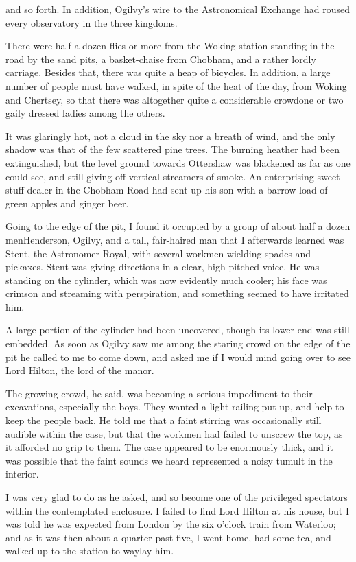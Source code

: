 and so forth. In addition, Ogilvy's wire to the Astronomical
Exchange had roused every observatory in the three kingdoms.

There were half a dozen flies or more from the Woking station
standing in the road by the sand pits, a basket-chaise from
Chobham, and a rather lordly carriage. Besides that, there was
quite a heap of bicycles. In addition, a large number of people
must have walked, in spite of the heat of the day, from Woking and
Chertsey, so that there was altogether quite a considerable
crowd\dash{}one or two gaily dressed ladies among the others.

It was glaringly hot, not a cloud in the sky nor a breath of wind,
and the only shadow was that of the few scattered pine trees. The
burning heather had been extinguished, but the level ground towards
Ottershaw was blackened as far as one could see, and still giving
off vertical streamers of smoke. An enterprising sweet-stuff dealer
in the Chobham Road had sent up his son with a barrow-load of green
apples and ginger beer.

Going to the edge of the pit, I found it occupied by a group of
about half a dozen men\dash{}Henderson, Ogilvy, and a tall, fair-haired
man that I afterwards learned was Stent, the Astronomer Royal, with
several workmen wielding spades and pickaxes. Stent was giving
directions in a clear, high-pitched voice. He was standing on the
cylinder, which was now evidently much cooler; his face was crimson
and streaming with perspiration, and something seemed to have
irritated him.

A large portion of the cylinder had been uncovered, though its
lower end was still embedded. As soon as Ogilvy saw me among the
staring crowd on the edge of the pit he called to me to come down,
and asked me if I would mind going over to see Lord Hilton, the
lord of the manor.

The growing crowd, he said, was becoming a serious impediment to
their excavations, especially the boys. They wanted a light railing
put up, and help to keep the people back. He told me that a faint
stirring was occasionally still audible within the case, but that
the workmen had failed to unscrew the top, as it afforded no grip
to them. The case appeared to be enormously thick, and it was
possible that the faint sounds we heard represented a noisy tumult
in the interior.

I was very glad to do as he asked, and so become one of the
privileged spectators within the contemplated enclosure. I failed
to find Lord Hilton at his house, but I was told he was expected
from London by the six o'clock train from Waterloo; and as it was
then about a quarter past five, I went home, had some tea, and
walked up to the station to waylay him.


